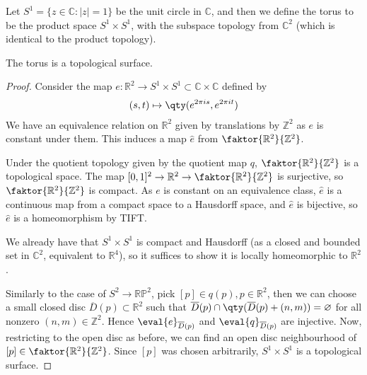 \begin{example}
	Let $S^1 = \{z \in \mathbb{C} : |z| = 1\}$ be the unit circle in $\mathbb C$, and then we define the torus to be the product space $S^1 \times S^1$, with the subspace topology from $\mathbb C^2$ (which is identical to the product topology).
	\begin{lemma}
		The torus is a topological surface.
	\end{lemma}
	\begin{proof}
		Consider the map $e : \mathbb R^2 \to S^1 \times S^1 \subset \mathbb{C} \times \mathbb{C}$ defined by
		\begin{align*}
			(s,t) \mapsto \qty(e^{2\pi i s}, e^{2 \pi i t})
		\end{align*}
		We have an equivalence relation on $\mathbb{R}^2$ given by translations by $\mathbb{Z}^2$ as $e$ is constant under them.
		This induces a map $\hat e$ from $\faktor{\mathbb R^2}{\mathbb Z^2}$.

		\begin{center}
			\ifdefined\hideproofs
			\else
			\fi
		\end{center}

		Under the quotient topology given by the quotient map $q$, $\faktor{\mathbb R^2}{\mathbb Z^2}$ is a topological space.
		The map $[0,1]^2 \to \mathbb R^2 \to \faktor{\mathbb R^2}{\mathbb Z^2}$ is surjective, so $\faktor{\mathbb R^2}{\mathbb Z^2}$ is compact.
		As $e$ is constant on an equivalence class, $\hat e$ is a continuous map from a compact space to a Hausdorff space, and $\hat e$ is bijective, so $\hat e$ is a homeomorphism by TIFT.

		We already have that $S^1 \times S^1$ is compact and Hausdorff (as a closed and bounded set in $\mathbb C^2$, equivalent to $\mathbb{R}^4$), so it suffices to show it is locally homeomorphic to $\mathbb R^2$.

		Similarly to the case of $S^2 \to \mathbb{R} \mathbb{P}^2$, pick $[p] \in q(p), p \in \mathbb{R}^2$, then we can choose a small closed disc $\overline D(p) \subset \mathbb{R}^2$ such that $\overline D(p) \cap \qty(\overline D(p) + (n,m)) = \varnothing$ for all nonzero $(n,m) \in \mathbb Z^2$.
		Hence $\eval{e}_{\overline D(p)}$ and $\eval{q}_{\overline D(p)}$ are injective.
		Now, restricting to the open disc as before, we can find an open disc neighbourhood of $[p] \in \faktor{\mathbb R^2}{\mathbb Z^2}$.
		Since $[p]$ was chosen arbitrarily, $S^1 \times S^1$ is a topological surface.
	\end{proof}


\end{example}
